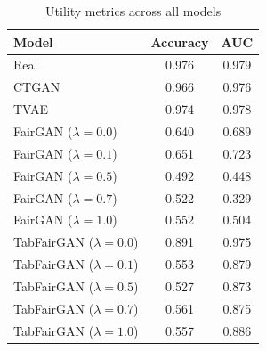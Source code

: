\begin{table}[h!]
\caption{Utility metrics across all models}
\label{tab:utility}
\centering
\begin{tabular}{lcc}
\toprule
Model & Accuracy & AUC \\
\midrule
Real & 0.976 & 0.979 \\
CTGAN & 0.966 & 0.976 \\
TVAE & 0.974 & 0.978 \\
FairGAN ($\lambda=0.0$) & 0.640 & 0.689 \\
FairGAN ($\lambda=0.1$) & 0.651 & 0.723 \\
FairGAN ($\lambda=0.5$) & 0.492 & 0.448 \\
FairGAN ($\lambda=0.7$) & 0.522 & 0.329 \\
FairGAN ($\lambda=1.0$) & 0.552 & 0.504 \\
TabFairGAN ($\lambda=0.0$) & 0.891 & 0.975 \\
TabFairGAN ($\lambda=0.1$) & 0.553 & 0.879 \\
TabFairGAN ($\lambda=0.5$) & 0.527 & 0.873 \\
TabFairGAN ($\lambda=0.7$) & 0.561 & 0.875 \\
TabFairGAN ($\lambda=1.0$) & 0.557 & 0.886 \\
\bottomrule
\end{tabular}
\end{table}
